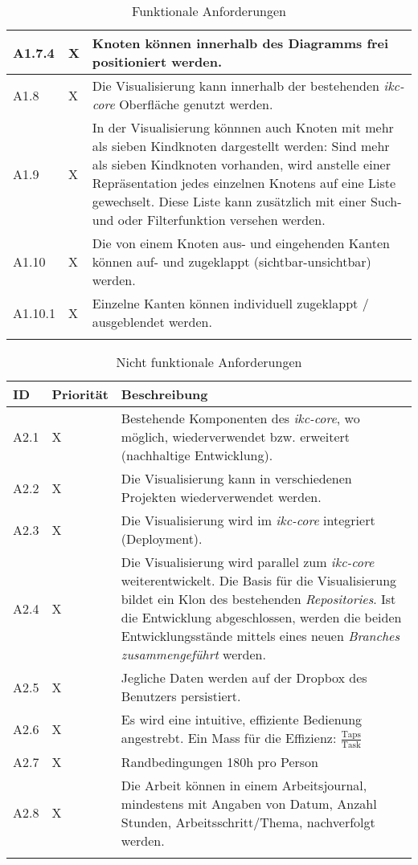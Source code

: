 \begin{longtable}{|p{1.5cm} | p{1.5cm} | p{8.1cm}|}
    A1.7.4 & X & Knoten können innerhalb des Diagramms frei positioniert werden.\\\hline 
    A1.8 & X & Die Visualisierung kann innerhalb der bestehenden \textit{ikc-core} Oberfläche genutzt werden.\\\hline 
    A1.9 & X & In der Visualisierung könnnen auch Knoten mit mehr als sieben Kindknoten dargestellt werden: Sind mehr als sieben Kindknoten vorhanden, wird anstelle einer Repräsentation jedes einzelnen Knotens auf eine Liste gewechselt. Diese Liste kann zusätzlich mit einer Such- und oder Filterfunktion versehen werden.\\\hline  
    A1.10 & X & Die von einem Knoten aus- und eingehenden Kanten können auf- und zugeklappt (sichtbar-unsichtbar) werden.\\\hline
    A1.10.1 & X & Einzelne Kanten können individuell zugeklappt / ausgeblendet werden.\\\hline
     
    \caption{Funktionale Anforderungen}
  \label{tab:funktionale-anforderungen}
\end{longtable}

\begin{longtable}{|p{1.5cm} | p{1.5cm} | p{8.1cm}|}
  \hline
    ID & Priorität & Beschreibung \\\hline
    A2.1 & X & Bestehende Komponenten des \textit{ikc-core}, wo möglich, wiederverwendet bzw. erweitert (nachhaltige Entwicklung).\\\hline
    A2.2 & X & Die Visualisierung kann in verschiedenen Projekten wiederverwendet werden.\\\hline
    A2.3 & X & Die Visualisierung wird im \textit{ikc-core} integriert (Deployment).\\\hline
    A2.4 & X & Die Visualisierung wird parallel zum \textit{ikc-core} weiterentwickelt. Die Basis für die Visualisierung bildet ein Klon des bestehenden \textit{Repositories}. Ist die Entwicklung abgeschlossen, werden die beiden Entwicklungsstände mittels eines neuen \textit{Branches} \textit{zusammengeführt} werden.\\\hline
    A2.5 & X & Jegliche Daten werden auf der Dropbox des Benutzers persistiert.\\\hline
    A2.6 & X & Es wird eine intuitive, effiziente Bedienung angestrebt. Ein Mass für die Effizienz: $\frac{\text{Taps}}{\text{Task}}$\\\hline
    A2.7 & X & Randbedingungen 180h pro Person\\\hline
    A2.8 & X & Die Arbeit können in einem Arbeitsjournal, mindestens mit Angaben von Datum, Anzahl Stunden, Arbeitsschritt/Thema, nachverfolgt werden.\\\hline
    \caption{Nicht funktionale Anforderungen}
  \label{tab:nicht-funktionale-anforderungen}
\end{longtable}

